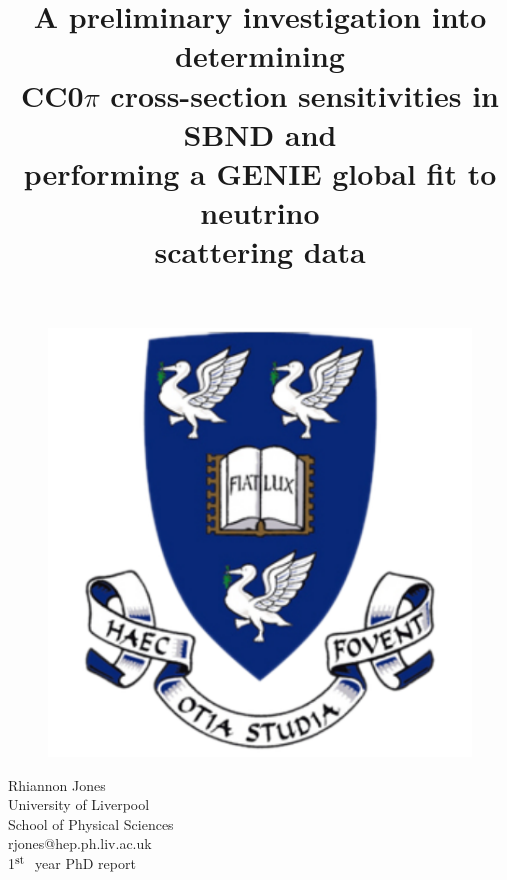 \documentclass[11pt]{article}
\title{\vspace{5mm}\fontsize{20pt}{12pt}\selectfont A preliminary investigation into determining \\ \vspace{3mm} CC0\(\pi\) cross-section sensitivities in SBND and \\ \vspace{4mm} performing a GENIE global fit to neutrino \\ \vspace{3mm} scattering data } %
\author{
    \date{}
}
\begin{document}
\nocite{*}


\maketitle %

\vspace{-9mm}

\begin{figure}[h!]
    \center
    \includegraphics[scale=0.6]{images/UoL_CoA.pdf}
\end{figure}

\vspace{3mm}

\begin{center}

    \large Rhiannon Jones\\
    \normalsize University of Liverpool \\
    \normalsize School of Physical Sciences \\ %
    \normalsize rjones@hep.ph.liv.ac.uk \\ 
    \vspace{3mm}
    \normalsize 1\( ^{ \mbox{\footnotesize st } } \) year PhD report \\

\end{center}
\end{document}

